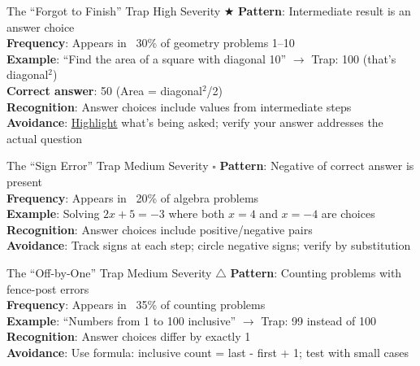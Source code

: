 \documentclass{article}
\begin{document}
\begin{trapbox}{The ``Forgot to Finish'' Trap \colorbox{red!20}{High Severity} $\bigstar$}
\textbf{Pattern}: Intermediate result is an answer choice\\
\textbf{Frequency}: Appears in ~30\% of geometry problems 1--10\\
\textbf{Example}: ``Find the area of a square with diagonal 10'' $\rightarrow$ Trap: 100 (that's diagonal$^2$)\\
\textbf{Correct answer}: 50 (Area = diagonal$^2$/2)\\
\textbf{Recognition}: Answer choices include values from intermediate steps\\
\textbf{Avoidance}: \underline{Highlight} what's being asked; verify your answer addresses the actual question
\end{trapbox}

\begin{trapbox}{The ``Sign Error'' Trap \colorbox{orange!20}{Medium Severity} $\square$}
\textbf{Pattern}: Negative of correct answer is present\\
\textbf{Frequency}: Appears in ~20\% of algebra problems\\
\textbf{Example}: Solving $2x + 5 = -3$ where both $x = 4$ and $x = -4$ are choices\\
\textbf{Recognition}: Answer choices include positive/negative pairs\\
\textbf{Avoidance}: Track signs at each step; circle negative signs; verify by substitution
\end{trapbox}

\begin{trapbox}{The ``Off-by-One'' Trap \colorbox{orange!20}{Medium Severity} $\triangle$}
\textbf{Pattern}: Counting problems with fence-post errors\\
\textbf{Frequency}: Appears in ~35\% of counting problems\\
\textbf{Example}: ``Numbers from 1 to 100 inclusive'' $\rightarrow$ Trap: 99 instead of 100\\
\textbf{Recognition}: Answer choices differ by exactly 1\\
\textbf{Avoidance}: Use formula: inclusive count = last - first + 1; test with small cases
\end{trapbox}
\end{document}
